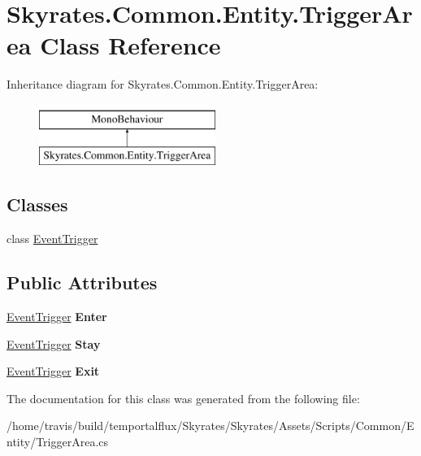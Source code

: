 \hypertarget{class_skyrates_1_1_common_1_1_entity_1_1_trigger_area}{\section{Skyrates.\-Common.\-Entity.\-Trigger\-Area Class Reference}
\label{class_skyrates_1_1_common_1_1_entity_1_1_trigger_area}
}
Inheritance diagram for Skyrates.\-Common.\-Entity.\-Trigger\-Area\-:\begin{figure}[H]
\begin{center}
\leavevmode
\includegraphics[height=2.000000cm]{class_skyrates_1_1_common_1_1_entity_1_1_trigger_area}
\end{center}
\end{figure}
\subsection*{Classes}
\begin{DoxyCompactItemize}
\item 
class \hyperlink{class_skyrates_1_1_common_1_1_entity_1_1_trigger_area_1_1_event_trigger}{Event\-Trigger}
\end{DoxyCompactItemize}
\subsection*{Public Attributes}
\begin{DoxyCompactItemize}
\item 
\hypertarget{class_skyrates_1_1_common_1_1_entity_1_1_trigger_area_a939e4cb3a3e25c816675877b5fef1c70}{\hyperlink{class_skyrates_1_1_common_1_1_entity_1_1_trigger_area_1_1_event_trigger}{Event\-Trigger} {\bfseries Enter}}\label{class_skyrates_1_1_common_1_1_entity_1_1_trigger_area_a939e4cb3a3e25c816675877b5fef1c70}

\item 
\hypertarget{class_skyrates_1_1_common_1_1_entity_1_1_trigger_area_ac6dc84b56b3220b95a0047d360cb99dc}{\hyperlink{class_skyrates_1_1_common_1_1_entity_1_1_trigger_area_1_1_event_trigger}{Event\-Trigger} {\bfseries Stay}}\label{class_skyrates_1_1_common_1_1_entity_1_1_trigger_area_ac6dc84b56b3220b95a0047d360cb99dc}

\item 
\hypertarget{class_skyrates_1_1_common_1_1_entity_1_1_trigger_area_ad65b533abe824d661cb1369759fad8b7}{\hyperlink{class_skyrates_1_1_common_1_1_entity_1_1_trigger_area_1_1_event_trigger}{Event\-Trigger} {\bfseries Exit}}\label{class_skyrates_1_1_common_1_1_entity_1_1_trigger_area_ad65b533abe824d661cb1369759fad8b7}

\end{DoxyCompactItemize}


The documentation for this class was generated from the following file\-:\begin{DoxyCompactItemize}
\item 
/home/travis/build/temportalflux/\-Skyrates/\-Skyrates/\-Assets/\-Scripts/\-Common/\-Entity/Trigger\-Area.\-cs\end{DoxyCompactItemize}
